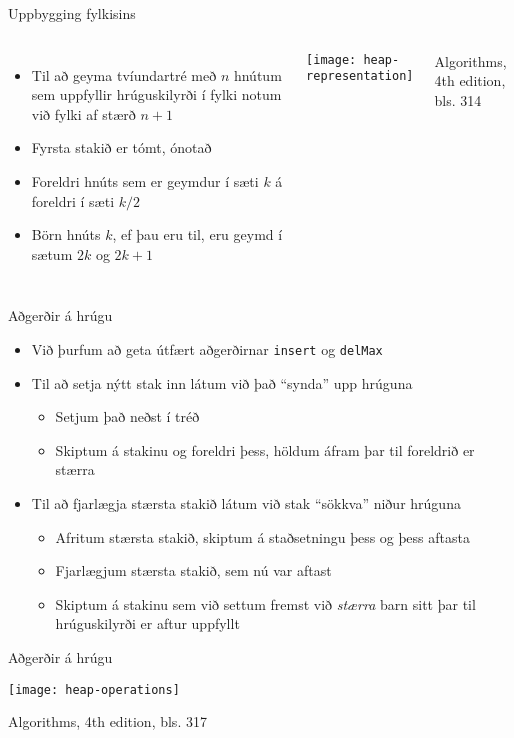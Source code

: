 \documentclass[handout]{beamer}
\begin{document}
\begin{frame}{Uppbygging fylkisins}
	\begin{columns}
		\begin{itemize}
			\item Til að geyma tvíundartré með $n$ hnútum sem uppfyllir hrúguskilyrði í fylki notum við fylki af stærð $n+1$
			\item Fyrsta stakið er tómt, ónotað
			\item Foreldri hnúts sem er geymdur í sæti $k$ á foreldri í sæti $k/2$
			\item Börn hnúts $k$, ef þau eru til, eru geymd í sætum $2k$ og $2k+1$
		\end{itemize}
		\texttt{[image: heap-representation]}

		Algorithms, 4th edition, bls. 314
	\end{columns}
\end{frame}

\begin{frame}{Aðgerðir á hrúgu}
	\begin{itemize}
		\item Við þurfum að geta útfært aðgerðirnar \texttt{insert} og \texttt{delMax}
		\item Til að setja nýtt stak inn látum við það ``synda'' upp hrúguna
		\begin{itemize}
			\item Setjum það neðst í tréð
			\item Skiptum á stakinu og foreldri þess, höldum áfram þar til foreldrið er stærra
		\end{itemize}
		\item Til að fjarlægja stærsta stakið látum við stak ``sökkva'' niður hrúguna
		\begin{itemize}
			\item Afritum stærsta stakið, skiptum á staðsetningu þess og þess aftasta
			\item Fjarlægjum stærsta stakið, sem nú var aftast
			\item Skiptum á stakinu sem við settum fremst við \emph{stærra} barn sitt þar til hrúguskilyrði er aftur uppfyllt
		\end{itemize}
	\end{itemize}
\end{frame}

\headonly

\begin{frame}{Aðgerðir á hrúgu}
	\begin{center}
		\texttt{[image: heap-operations]}
	\end{center}
	Algorithms, 4th edition, bls. 317
\end{frame}
\end{document}
